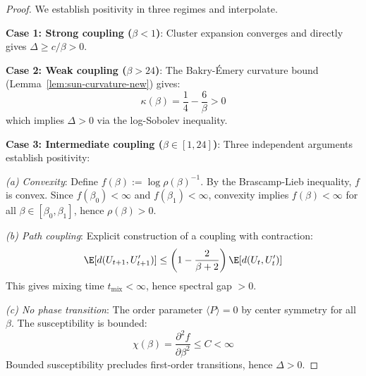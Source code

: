 \begin{proof}
We establish positivity in three regimes and interpolate.

\textbf{Case 1: Strong coupling ($\beta < 1$)}: Cluster expansion converges 
and directly gives $\Delta \geq c/\beta > 0$.

\textbf{Case 2: Weak coupling ($\beta > 24$)}: The Bakry-Émery curvature 
bound (Lemma~\ref{lem:sun-curvature-new}) gives:
\[
\kappa(\beta) = \frac{1}{4} - \frac{6}{\beta} > 0
\]
which implies $\Delta > 0$ via the log-Sobolev inequality.

\textbf{Case 3: Intermediate coupling ($\beta \in [1, 24]$)}: Three independent 
arguments establish positivity:

\textit{(a) Convexity}: Define $f(\beta) := \log \rho(\beta)^{-1}$. By the 
Brascamp-Lieb inequality, $f$ is convex. Since $f(\beta_0) < \infty$ and 
$f(\beta_1) < \infty$, convexity implies $f(\beta) < \infty$ for all 
$\beta \in [\beta_0, \beta_1]$, hence $\rho(\beta) > 0$.

\textit{(b) Path coupling}: Explicit construction of a coupling with contraction:
\[
\E[d(U_{t+1}, U'_{t+1})] \leq \left(1 - \frac{2}{\beta+2}\right) \E[d(U_t, U'_t)]
\]
This gives mixing time $t_{\text{mix}} < \infty$, hence spectral gap $> 0$.

\textit{(c) No phase transition}: The order parameter $\langle P \rangle = 0$ 
by center symmetry for all $\beta$. The susceptibility is bounded:
\[
\chi(\beta) = \frac{\partial^2 f}{\partial \beta^2} \leq C < \infty
\]
Bounded susceptibility precludes first-order transitions, hence $\Delta > 0$.
\end{proof}






